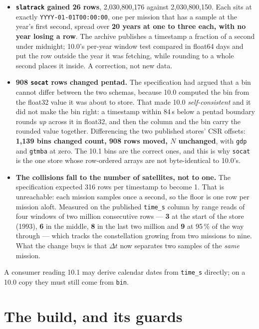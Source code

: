 \documentclass[10pt]{article}
\newcommand{\code}[1]{\texttt{#1}}
\begin{document}
\begin{itemize}\itemsep2pt
\item \textbf{\code{slatrack} gained 26 rows}, 2,030,800,176 against
2,030,800,150. Each sits at exactly \code{YYYY-01-01T00:00:00}, one per mission
that has a sample at the year's first second, spread over \textbf{20 years at
one to three each, with no year losing a row}. The archive publishes a
timestamp a fraction of a second under midnight; 10.0's per-year window test
compared in float64 days and put the row outside the year it was fetching,
while rounding to a whole second places it inside. A correction, not new data.
\item \textbf{908 \code{socat} rows changed pentad.} The specification had
argued that a bin cannot differ between the two schemas, because 10.0 computed
the bin from the float32 value it was about to store. That made 10.0
\emph{self-consistent} and it did not make the bin right: a timestamp within
84\,s below a pentad boundary rounds \emph{up} across it in float32, and then
the column and the bin carry the rounded value together. Differencing the two
published stores' CSR offsets: \textbf{1,139 bins changed count, 908 rows
moved, $N$ unchanged}, with \code{gdp} and \code{gtmba} at zero. The 10.1 bins
are the correct ones, and this is why \code{socat} is the one store whose
row-ordered arrays are not byte-identical to 10.0's.
\item \textbf{The collisions fall to the number of satellites, not to one.}
The specification expected 316 rows per timestamp to become 1. That is
unreachable: each mission samples once a second, so the floor is one row per
mission aloft. Measured on the published \code{time\_s} column by range reads of
four windows of two million consecutive rows --- \textbf{3} at the start of the
store (1993), \textbf{6} in the middle, \textbf{8} in the last two million and
\textbf{9} at 95\,\% of the way through --- which tracks the constellation
growing from two missions to nine. What the change buys is that $\Delta t$ now
separates two samples of the \emph{same} mission.
\end{itemize}

\noindent A consumer reading 10.1 may derive calendar dates from \code{time\_s}
directly; on a 10.0 copy they must still come from \code{bin}.

\section{The build, and its guards}
\end{document}
